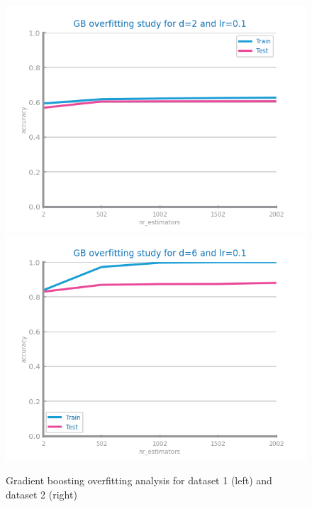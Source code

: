 \documentclass[10pt]{extarticle}
\begin{document}
\begin{figure}[H]
\centering\includegraphics[scale=0.7]{images/dataset1/models_evaluation/CovidPos_gb_accuracy_overfitting.png}
\includegraphics[scale=0.7]{images/dataset2/models_evaluation/Credit_Score_gb_accuracy_overfitting.png}
\caption{Gradient boosting overfitting analysis for dataset 1 (left) and dataset 2 (right)}
\end{figure}
\end{document}

